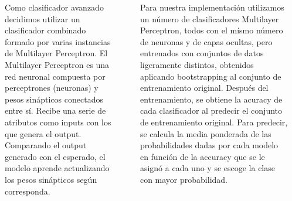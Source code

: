 \documentclass[25pt,landscape]{tikzposter}
\begin{document}
\begin{columns}
{		\paragraph{}Como clasificador avanzado decidimos utilizar un clasificador combinado formado por varias instancias de Multilayer Perceptron. El Multilayer Perceptron es una red neuronal compuesta por perceptrones (neuronas) y pesos sinápticos conectados entre sí. Recibe una serie de atributos como inputs con los que genera el output. Comparando el output generado con el esperado, el modelo aprende actualizando los pesos sinápticos según corresponda.
		\paragraph{}Para nuestra implementación utilizamos un número de clasificadores Multilayer Perceptron, todos con el mísmo número de neuronas y de capas ocultas, pero entrenados con conjuntos de datos ligeramente distintos, obtenidos aplicando bootstrapping al conjunto de entrenamiento original. Después del entrenamiento, se obtiene la acuracy de cada clasificador al predecir el conjunto de entrenamiento original. Para predecir, se calcula la media ponderada de las probabilidades dadas por cada modelo en función de la accuracy que se le asignó a cada uno y se escoge la clase con mayor probabilidad.
    }

\end{columns}
\end{document}
